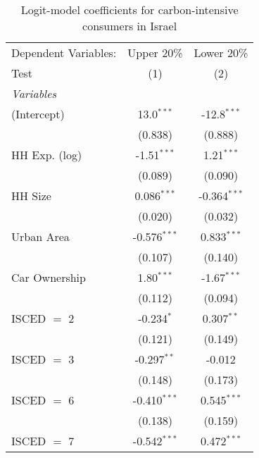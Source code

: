 
\begin{table}[htbp!]
   \centering
   \small
   \begin{adjustbox}{width = 1\textwidth, max height = 0.95\textheight, center}
      \begin{threeparttable}[b]
         \caption{\label{tab:Logit_1_ISR} Logit-model coefficients for carbon-intensive consumers in Israel}
         \begin{tabular}{lcc}
            \tabularnewline \midrule \midrule
            Dependent Variables: & Upper 20\%     & Lower 20\%\\   
            Test                 & (1)            & (2)\\  
            \midrule
            \emph{Variables}\\
            (Intercept)          & 13.0$^{***}$   & -12.8$^{***}$\\   
                                 & (0.838)        & (0.888)\\   
            HH Exp. (log)        & -1.51$^{***}$  & 1.21$^{***}$\\   
                                 & (0.089)        & (0.090)\\   
            HH Size              & 0.086$^{***}$  & -0.364$^{***}$\\   
                                 & (0.020)        & (0.032)\\   
            Urban Area           & -0.576$^{***}$ & 0.833$^{***}$\\   
                                 & (0.107)        & (0.140)\\   
            Car Ownership        & 1.80$^{***}$   & -1.67$^{***}$\\   
                                 & (0.112)        & (0.094)\\   
            ISCED $=$ 2          & -0.234$^{*}$   & 0.307$^{**}$\\   
                                 & (0.121)        & (0.149)\\   
            ISCED $=$ 3          & -0.297$^{**}$  & -0.012\\   
                                 & (0.148)        & (0.173)\\   
            ISCED $=$ 6          & -0.410$^{***}$ & 0.545$^{***}$\\   
                                 & (0.138)        & (0.159)\\   
            ISCED $=$ 7          & -0.542$^{***}$ & 0.472$^{***}$\\   

\end{tabular}
\end{threeparttable}
\end{adjustbox}
\end{table}
